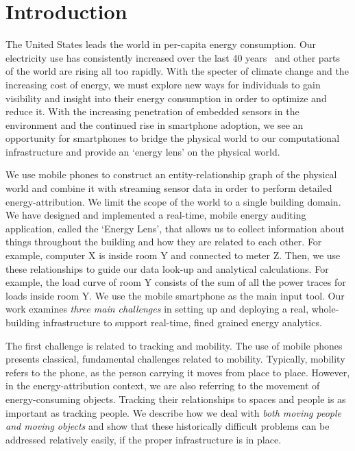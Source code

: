 \section{Introduction}
The United States leads the world in per-capita energy consumption.
Our electricity use has consistently increased over the last 40 years~\cite{oecd2011} and other parts of the world are rising all 
too rapidly.  With the specter of climate change and the increasing cost of energy, we must explore new
ways for individuals to gain visibility and insight into their energy consumption in order to optimize and reduce it. 
With the increasing penetration of embedded sensors in the environment and
the continued rise in smartphone adoption, we see an opportunity for smartphones to bridge the physical world
to our computational infrastructure and provide an `energy lens' on the physical world.  

We use mobile phones to construct an entity-relationship 
graph of the physical world and combine it with streaming sensor data in order to perform detailed energy-attribution.
We limit the scope of the world to a single building domain.  We have designed and implemented a real-time, mobile energy auditing
application, called the `Energy Lens', that allows us to collect information about 
things throughout the building and how they are related to each other.  For example, computer X is inside 
room Y and connected to meter Z.  Then, we use these relationships to guide our data look-up and analytical
calculations.  For example, the load curve of room Y consists of the sum of all the power traces for loads
inside room Y.  We use the mobile smartphone as the main input tool.  Our work examines \emph{three main challenges} in setting up and 
deploying a real, whole-building infrastructure to support real-time, 
fined grained energy analytics.  

The first challenge is related to tracking and mobility.
The use of mobile phones presents classical, fundamental challenges related to mobility.  Typically, mobility
refers to the phone, as the person carrying it moves from place to place.  However, in the energy-attribution
context, we are also referring to the movement of energy-consuming objects.  Tracking their relationships to spaces 
and people is as important as tracking people.  We describe how we deal with \emph{both moving people and 
moving objects} and show that these historically difficult problems can be addressed relatively easily, if the proper infrastructure is 
in place.  %

